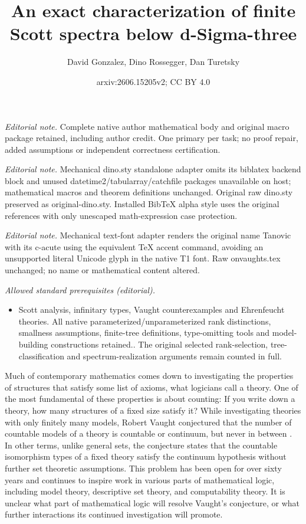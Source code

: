 \documentclass[10pt,a4paper]{amsart}
\title{An exact characterization of finite Scott spectra below d-Sigma-three}
\author{David Gonzalez, Dino Rossegger, Dan Turetsky}
\date{arxiv:2606.15205v2; CC BY 4.0}
\renewcommand{\-}{\text{-}}
\begin{document}
\maketitle
\noindent\textit{Editorial note.} Complete native author mathematical body and original macro package retained, including author credit. One primary per task; no proof repair, added assumptions or independent correctness certification.\par\medskip
\noindent\textit{Editorial note.} Mechanical dino.sty standalone adapter omits its biblatex backend block and unused datetime2/tabularray/catchfile packages unavailable on host; mathematical macros and theorem definitions unchanged. Original raw dino.sty preserved as original-dino.sty. Installed BibTeX alpha style uses the original references with only unescaped math-expression case protection.\par\medskip
\noindent\textit{Editorial note.} Mechanical text-font adapter renders the original name Tanovic with its c-acute using the equivalent TeX accent command, avoiding an unsupported literal Unicode glyph in the native T1 font. Raw onvaughts.tex unchanged; no name or mathematical content altered.\par\medskip
\noindent\textit{Allowed standard prerequisites (editorial).}\begin{itemize}
\item Scott analysis, infinitary types, Vaught counterexamples and Ehrenfeucht theories. All native parameterized/unparameterized rank distinctions, smallness assumptions, finite-tree definitions, type-omitting tools and model-building constructions retained.. The original selected rank-selection, tree-classification and spectrum-realization arguments remain counted in full.
\end{itemize}\medskip
Much of contemporary mathematics comes down to investigating the properties of structures that satisfy some list of axioms, what logicians call a theory.
One of the most fundamental of these properties is about counting:
If you write down a theory, how many structures of a fixed size satisfy it?
While investigating theories with only finitely many models, Robert Vaught conjectured that the number of countable models of a theory is countable or continuum, but never in between \cite{Vau61}.
In other terms, unlike general sets, the conjecture states that the countable isomorphism types of a fixed theory satisfy the continuum hypothesis without further set theoretic assumptions.
This problem has been open for over sixty years and continues to inspire work in various parts of mathematical logic, including model theory, descriptive set theory, and computability theory.
It is unclear what part of mathematical logic will resolve Vaught's conjecture, or what further interactions its continued investigation will promote.
\end{document}
